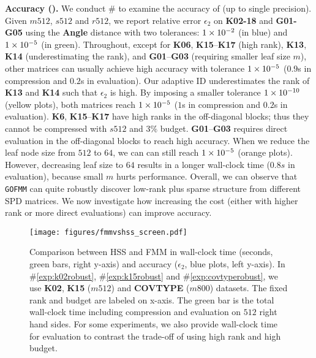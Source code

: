 \textbf{Accuracy ().}
We conduct \#\rownumber\label{exp:robust} to examine the accuracy of \gofmm{} (up to single precision).
Given $m512$, $s512$ and $r512$, we report relative error $\epsilon_2$
on {\bf K02-18} and {\bf G01-G05} using the \textbf{Angle} distance with
two tolerances: $\num{1E-2}$ (in blue) and $\num{1E-5}$ (in green). 
Throughout, except for \textbf{K06}, \textbf{K15}--\textbf{K17} (high rank),
\textbf{K13}, \textbf{K14} (underestimating the rank), and
\textbf{G01}--\textbf{G03} (requiring smaller leaf size $m$),
other matrices can usually achieve high accuracy with tolerance $\num{1E-5}$
($0.9$s in compression and $0.2$s in evaluation).
Our adaptive ID underestimates the rank of \textbf{K13} and \textbf{K14} 
such that $\epsilon_2$ is high. By imposing a smaller tolerance 
$\num{1E-10}$ (yellow plots), both matrices 
reach $\num{1E-5}$ ($1$s in compression and $0.2$s in evaluation).
\textbf{K6}, \textbf{K15}--\textbf{K17} have high ranks in the 
off-diagonal blocks; thus they cannot be compressed with $s512$ 
and $3\%$ budget. \textbf{G01}--\textbf{G03} requires direct evaluation in the off-diagonal 
blocks to reach high accuracy. When we reduce the leaf node size from $512$ to $64$, 
we can can still reach $\num{1E-5}$ (orange plots).
However, decreasing leaf size to $64$ results in a longer wall-clock time
($0.8s$ in evaluation), because small $m$ hurts performance.
Overall, we can observe that \texttt{GOFMM} can quite robustly discover
low-rank plus sparse structure from different SPD matrices.
We now investigate how increasing the cost (either with higher rank
or more direct evaluations) can  improve accuracy.

\begin{figure}[!t]
  \centering
  \texttt{[image: figures/fmmvshss\_screen.pdf]}
  \caption{Comparison between HSS and FMM in
  wall-clock time (seconds, green bars, right y-axis) and accuracy ($\epsilon_2$, blue
  plots, left y-axis).
  In \#\ref{exp:k02robust}, \#\ref{exp:k15robust}
  and \#\ref{exp:covtyperobust},
  we use \textbf{K02}, \textbf{K15} ($m512$) and \textbf{COVTYPE} ($m800$)
  datasets. 
  The fixed rank and budget are labeled on x-axis.
  The green bar is the total wall-clock time including compression and evaluation
  on $512$ right hand sides. 
  For some experiments, we also provide wall-clock time for evaluation to contrast
  the trade-off of using high rank and high budget.
  }
  \label{fig:fmmvshss}
\end{figure}



